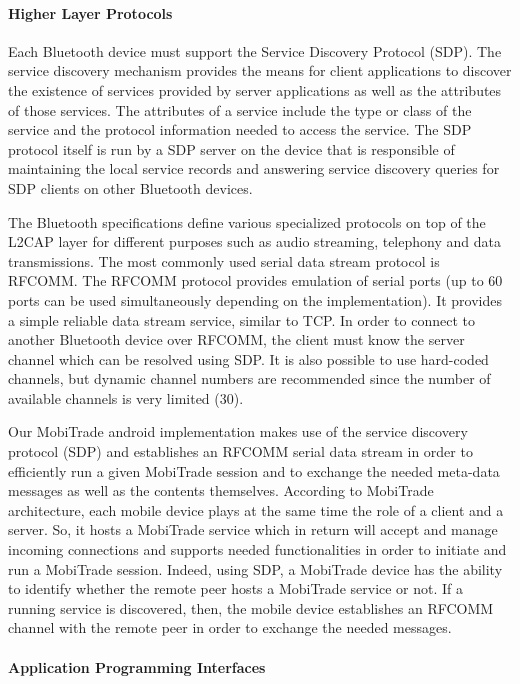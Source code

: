 \paragraph*{Higher Layer Protocols}

Each Bluetooth device must support the Service Discovery Protocol (SDP). The service discovery mechanism provides the means for client applications to discover the existence of services provided by server applications as well as the attributes of those services. The attributes of a service include the type or class of the service and the protocol information needed to access the service. The SDP protocol itself is run by a SDP server on the device that is responsible of maintaining the local service records and answering service discovery queries for SDP clients on other Bluetooth devices.

The Bluetooth specifications define various specialized protocols on top of the L2CAP layer for different purposes such as audio streaming, telephony and data transmissions. The most commonly used serial data stream protocol is RFCOMM. The RFCOMM protocol provides emulation of serial ports (up to 60 ports can be used simultaneously depending on the implementation). It provides a simple reliable data stream service, similar to TCP. In order to connect to another Bluetooth device over RFCOMM, the client must know the server channel which can be resolved using SDP. It is also possible to use hard-coded channels, but dynamic channel numbers are recommended since the number of available channels is very limited (30). 

Our MobiTrade android implementation makes use of the service discovery protocol (SDP) and establishes an RFCOMM serial data stream in order to efficiently run a given MobiTrade session and to exchange the needed meta-data messages as well as the contents themselves. According to MobiTrade architecture, each mobile device plays at the same time the role of a client and a server. So, it hosts a MobiTrade service which in return will accept and manage incoming connections and supports needed functionalities in order to initiate and run a MobiTrade session. Indeed,  using SDP, a MobiTrade device has the ability to identify whether the remote peer hosts a MobiTrade service or not. If a running service is discovered, then, the mobile device establishes an RFCOMM channel with the remote peer in order to exchange the needed messages.    

\paragraph*{Application Programming Interfaces}

